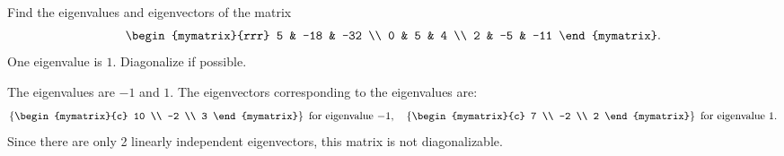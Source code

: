 \begin{enumialphparenastyle}
\begin{ex}
  Find the eigenvalues and eigenvectors of the matrix
  \begin{equation*}
    \begin{mymatrix}{rrr}
      5 & -18 & -32 \\
      0 & 5 & 4 \\
      2 & -5 & -11
    \end{mymatrix}.
  \end{equation*}
  One eigenvalue is $1$. Diagonalize if possible.
  \begin{sol}
    The eigenvalues are $-1$ and $1$. The eigenvectors corresponding to
    the eigenvalues are:
    \begin{equation*}
      \set{\begin{mymatrix}{c}
          10 \\
          -2 \\
          3
        \end{mymatrix} } ~\mbox{for eigenvalue}~ {-1},
      \quad
      \set{\begin{mymatrix}{c}
          7 \\
          -2 \\
          2
        \end{mymatrix} } ~\mbox{for eigenvalue}~ {1}.
    \end{equation*}
    Since there are only 2 linearly independent eigenvectors, this
    matrix is not diagonalizable.
  \end{sol}
\end{ex}


\end{enumialphparenastyle}

